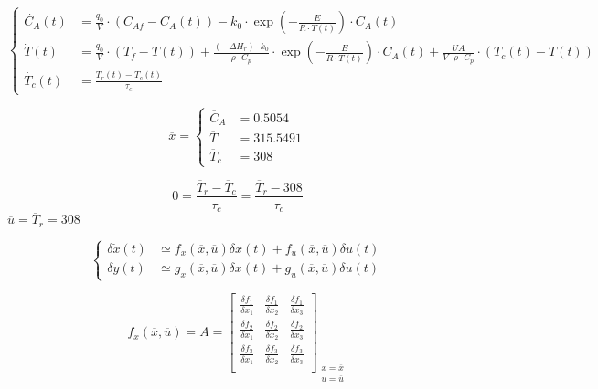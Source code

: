 \documentclass{report}
\begin{document}
	\begin{equation}
		\begin{cases}
			\dot{C_A}(t) &= \frac{q_0}{V}\cdot (C_{Af}-C_A(t))-k_0\cdot \exp \left({-\frac{E}{R\cdot T(t)}} \right) \cdot C_A(t) \\[7pt]
			\dot{T}(t)&=\frac{q_0}{V}\cdot (T_f-T(t))+ \frac{(-\Delta H_r)\cdot k_0}{\rho \cdot C_p}\cdot \exp{\left( -\frac{E}{R \cdot T(t)} \right)}\cdot C_A(t) + \frac{UA}{V\cdot\rho\cdot C_p}\cdot(T_c(t) - T(t))\\[7pt]
			\dot{T_c}(t) &= \frac{T_r(t)-T_c(t)}{\tau_c}
		\end{cases}
	\end{equation}
	
	
	
	
	
	
	\begin{equation}
		\overline{x}=
		\begin{cases}
			\overline{C}_A &= 0.5054 \\[5pt]
			\overline{T} &= 315.5491 \\[5pt]
			\overline{T}_c &= 308			
		\end{cases}
	\end{equation}
	
	\begin{equation}
		0 = \frac{\overline{T}_r-\overline{T}_c}{\tau_c} = \frac{\overline{T}_r-308}{\tau_c}
	\end{equation}
	$\overline{u} = \overline{T}_r=308$
	
	
	\begin{equation}
		\begin{cases}
			\delta\dot{x}(t) &\simeq f_x(\overline{x},\overline{u})\delta x(t) + f_u(\overline{x},\overline{u})\delta u(t) \\[8pt]
			\delta y(t) &\simeq g_x(\overline{x},\overline{u})\delta x(t) + g_u(\overline{x},\overline{u})\delta u(t)
		\end{cases}
	\end{equation}
	
	\begin{equation}
		f_x(\overline{x},\overline{u}) = A =
		\begin{bmatrix}
			\frac{\delta f_1}{\delta x_1} & \frac{\delta f_1}{\delta x_2} & \frac{\delta f_1}{\delta x_3} \\[5pt]
			\frac{\delta f_2}{\delta x_1} & \frac{\delta f_2}{\delta x_2} & \frac{\delta f_2}{\delta x_3} \\[5pt]
			\frac{\delta f_3}{\delta x_1} & \frac{\delta f_3}{\delta x_2} & \frac{\delta f_3}{\delta x_3} \\			
		\end{bmatrix}_{\substack{x=\overline{x} \\ u=\overline{u}}}
	\end{equation}
	
\end{document}
